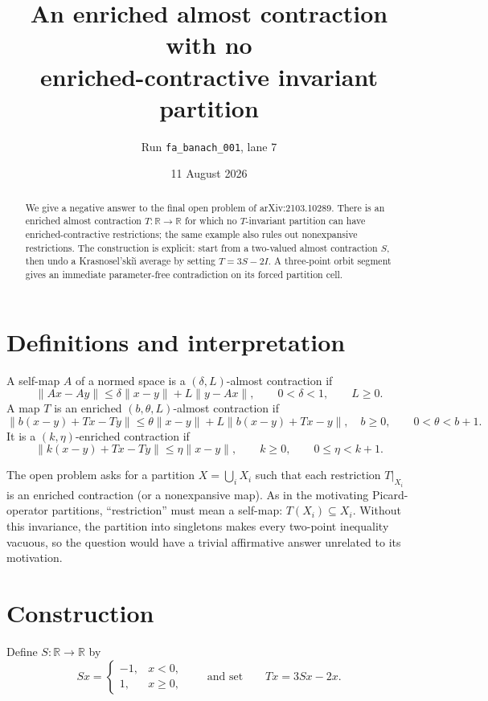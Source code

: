 \documentclass[11pt]{article}
\title{An enriched almost contraction with no\\
enriched-contractive invariant partition}
\author{Run \texttt{fa\_banach\_001}, lane 7}
\date{11 August 2026}
\newcommand{\R}{\mathbb R}
\begin{document}
\maketitle

\begin{abstract}
We give a negative answer to the final open problem of arXiv:2103.10289.
There is an enriched almost contraction \(T:\R\to\R\) for which no
\(T\)-invariant partition can have enriched-contractive restrictions; the
same example also rules out nonexpansive restrictions.  The construction is
explicit: start from a two-valued almost contraction \(S\), then undo a
Krasnosel'ski\u\i{} average by setting \(T=3S-2I\).  A three-point orbit
segment gives an immediate parameter-free contradiction on its forced
partition cell.
\end{abstract}

\section{Definitions and interpretation}

A self-map \(A\) of a normed space is a \((\delta,L)\)-almost contraction if
\[
 \|Ax-Ay\|\le \delta\|x-y\|+L\|y-Ax\|,
 \qquad 0<\delta<1,\qquad L\ge0.                      \tag{1}
\]
A map \(T\) is an enriched \((b,\theta,L)\)-almost contraction if
\[
 \|b(x-y)+Tx-Ty\|
 \le \theta\|x-y\|+L\|b(x-y)+Tx-y\|,
 \quad b\ge0,\qquad 0<\theta<b+1.                    \tag{2}
\]
It is a \((k,\eta)\)-enriched contraction if
\[
 \|k(x-y)+Tx-Ty\|\le\eta\|x-y\|,
 \qquad k\ge0,\qquad 0\le\eta<k+1.                  \tag{3}
\]

The open problem asks for a partition \(X=\bigcup_iX_i\) such that each
restriction \(T|_{X_i}\) is an enriched contraction (or a nonexpansive map).
As in the motivating Picard-operator partitions, ``restriction'' must mean a
self-map: \(T(X_i)\subseteq X_i\).  Without this invariance, the partition
into singletons makes every two-point inequality vacuous, so the question
would have a trivial affirmative answer unrelated to its motivation.

\section{Construction}

Define \(S:\R\to\R\) by
\[
 Sx=\begin{cases}
 -1,&x<0,\\
  1,&x\ge0,
 \end{cases}
 \qquad\text{and set}\qquad
 Tx=3Sx-2x.                                             \tag{4}
\]
\end{document}
